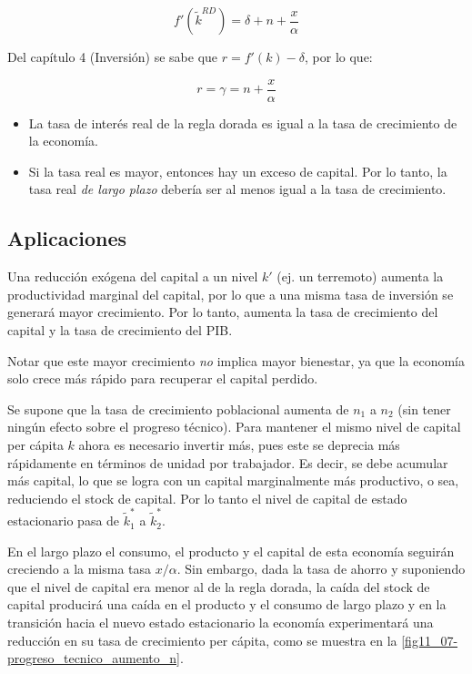 \documentclass[DeGregorioResumen]{subfiles}
\begin{document}
\begin{equation*}
f'(\tilde k^{RD}) = \delta + n + \frac{x}{\alpha}
\end{equation*}

Del capítulo 4 (Inversión) se sabe que $r=f'(k)-\delta$, por lo que:

\begin{equation}
r = \gamma = n+\frac{x}{\alpha}
\end{equation}

\begin{itemize}
\item La tasa de interés real de la regla dorada es igual a la tasa de crecimiento de la economía.
\item Si la tasa real es mayor, entonces hay un exceso de capital. Por lo tanto, la tasa real \emph{de largo plazo} debería ser al menos igual a la tasa de crecimiento.
\end{itemize}

\subsection{Aplicaciones}

Una reducción exógena del capital a un nivel $k'$ (ej. un terremoto) aumenta la productividad marginal del capital, por lo que a una misma tasa de inversión se generará mayor crecimiento. Por lo tanto, aumenta la tasa de crecimiento del capital y la tasa de crecimiento del PIB.

Notar que este mayor crecimiento \emph{no} implica mayor bienestar, ya que la economía solo crece más rápido para recuperar el capital perdido.

Se supone que la tasa de crecimiento poblacional aumenta de $n_1$ a $n_2$ (sin tener ningún efecto sobre el progreso técnico). Para mantener el mismo nivel de capital per cápita $k$ ahora es necesario invertir más, pues este se deprecia más rápidamente en términos de unidad por trabajador. Es decir, se debe acumular más capital, lo que se logra con un capital marginalmente más productivo, o sea, reduciendo el stock de capital. Por lo tanto el nivel de capital de estado estacionario pasa de $\tilde k^*_1$ a $\tilde k^*_2$.



En el largo plazo el consumo, el producto y el capital de esta economía seguirán creciendo a la misma tasa $x/\alpha$. Sin embargo, dada la tasa de ahorro y suponiendo que el nivel de capital era menor al de la regla dorada, la caída del stock de capital producirá una caída en el producto y el consumo de largo plazo y en la transición hacia el nuevo estado estacionario la economía experimentará una reducción en su tasa de crecimiento per cápita, como se muestra en la \autoref{fig11_07-progreso_tecnico_aumento_n}.
\end{document}
